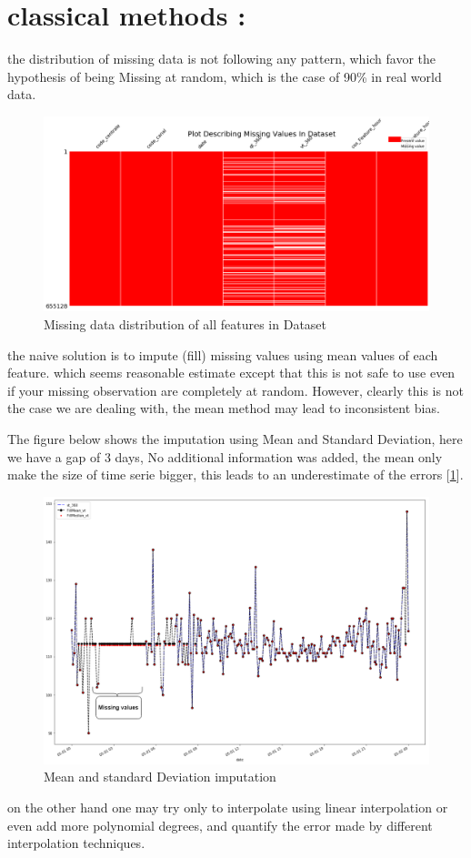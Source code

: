 \section{classical methods :}

the distribution of missing data is not following any pattern, which favor the hypothesis of being Missing at random, which is the case of 90\% in real world data.

%
\begin{figure}[H]
\centering
\includegraphics[width=.9\textwidth]{img/missing_values_distributation.png} 
\caption{Missing data distribution of all features in Dataset}
\label{fig:presteps}
\end{figure}
%

the naive solution is to impute (fill) missing values using mean values of each feature. which seems reasonable estimate except that this is not safe to use even if your missing observation are completely at random. However, clearly this is not the case we are dealing with, the mean  method may lead to inconsistent bias. 

The figure below shows the imputation  using Mean and Standard Deviation,  here we have a gap of 3 days, No additional information was added, the mean only make  the size of time serie bigger, this leads to an underestimate of the errors [\ref{}].
%
\begin{figure}[H]
\centering
\includegraphics[scale=.4]{img/mean_median.png} 
\caption{Mean and standard Deviation imputation}
\label{fig:presteps}
\end{figure}
%
on the other hand one may try only to interpolate using linear interpolation or even add more polynomial degrees, and quantify the error made by different interpolation techniques.

